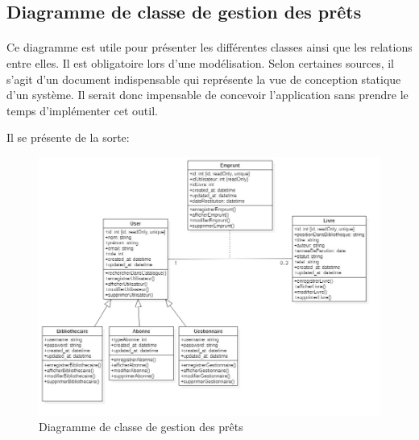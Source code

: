 \subsection{Diagramme de classe de gestion des prêts}
\paragraph{}

Ce diagramme est utile pour présenter les différentes classes ainsi que les relations 
entre elles. Il est obligatoire lors d'une modélisation. Selon certaines sources, il 
s'agit d'un document indispensable qui représente la vue de conception statique 
d'un système. Il serait donc impensable de concevoir l'application sans prendre le temps 
d'implémenter cet outil.
\par 
Il se présente de la sorte: \par 
\begin{figure}[h]
        \centering
        \includegraphics[width=1\textwidth]{ClassDiagram1}
        \caption{Diagramme de classe de gestion des prêts}
        \label{image-ClassDiagram1}
        \end{figure}
\par